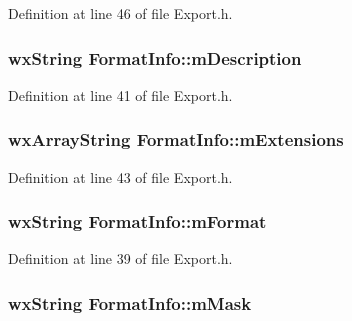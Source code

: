 Definition at line 46 of file Export.\+h.

\subsubsection[{\texorpdfstring{m\+Description}{mDescription}}]{\setlength{\rightskip}{0pt plus 5cm}wx\+String Format\+Info\+::m\+Description}\hypertarget{class_format_info_a3b3843587ba5477383c398f37d8b5eea}{}\label{class_format_info_a3b3843587ba5477383c398f37d8b5eea}


Definition at line 41 of file Export.\+h.

\subsubsection[{\texorpdfstring{m\+Extensions}{mExtensions}}]{\setlength{\rightskip}{0pt plus 5cm}wx\+Array\+String Format\+Info\+::m\+Extensions}\hypertarget{class_format_info_aa984a8201ea2a7669047077c08f83858}{}\label{class_format_info_aa984a8201ea2a7669047077c08f83858}


Definition at line 43 of file Export.\+h.

\subsubsection[{\texorpdfstring{m\+Format}{mFormat}}]{\setlength{\rightskip}{0pt plus 5cm}wx\+String Format\+Info\+::m\+Format}\hypertarget{class_format_info_a754a47fefe3eb4028cf4bbd714c3bb63}{}\label{class_format_info_a754a47fefe3eb4028cf4bbd714c3bb63}


Definition at line 39 of file Export.\+h.

\subsubsection[{\texorpdfstring{m\+Mask}{mMask}}]{\setlength{\rightskip}{0pt plus 5cm}wx\+String Format\+Info\+::m\+Mask}\hypertarget{class_format_info_a46b77bef0ac5b8356bf098d9ddfc89cc}{}\label{class_format_info_a46b77bef0ac5b8356bf098d9ddfc89cc}


